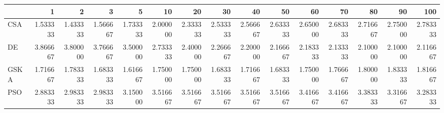 \begin{tabular}{lrrrrrrrrrrrrrr}
\toprule
{} &       1   &       2   &       3   &       5   &       10  &       20  &       30  &       40  &       50  &       60  &       70  &       80  &       90  &       100 \\
\midrule
CSA  &  1.533333 &  1.433333 &  1.566667 &  1.733333 &  2.000000 &  2.333333 &  2.533333 &  2.566667 &  2.633333 &  2.650000 &  2.683333 &  2.716667 &  2.750000 &  2.783333 \\
DE   &  3.866667 &  3.800000 &  3.766667 &  3.500000 &  2.733333 &  2.400000 &  2.266667 &  2.200000 &  2.166667 &  2.183333 &  2.133333 &  2.100000 &  2.100000 &  2.116667 \\
GSKA &  1.716667 &  1.783333 &  1.683333 &  1.616667 &  1.750000 &  1.750000 &  1.683333 &  1.716667 &  1.683333 &  1.750000 &  1.766667 &  1.800000 &  1.833333 &  1.816667 \\
PSO  &  2.883333 &  2.983333 &  2.983333 &  3.150000 &  3.516667 &  3.516667 &  3.516667 &  3.516667 &  3.516667 &  3.416667 &  3.416667 &  3.383333 &  3.316667 &  3.283333 \\
\bottomrule
\end{tabular}
